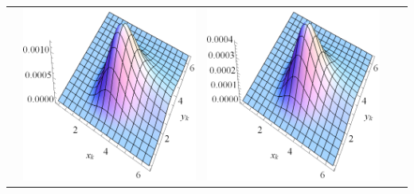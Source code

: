 \documentclass[12pt,a4paper,twoside]{article}
\begin{document}
\begin{table}[]
\begin{tabular}{@{}ccccc@{}}
&\includegraphics[scale=0.5]{W1_6}         
&\includegraphics[scale=0.5]{W1_7}         

\end{tabular}
\end{table}
\end{document}
